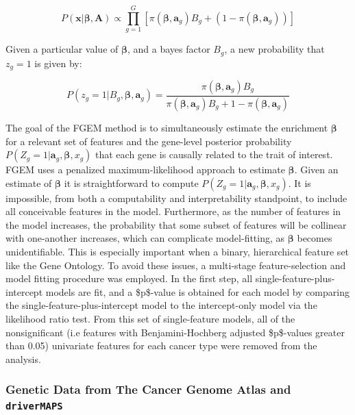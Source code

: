 $$P(\textbf{x}|\boldsymbol{\beta},\textbf{A}) \propto \prod_{g=1}^{G}[\pi(\boldsymbol{\beta},\textbf{a}_g)B_g+(1-\pi(\boldsymbol{\beta},\textbf{a}_g))]$$

Given a particular value of \(\boldsymbol{\beta}\), and a bayes factor \(B_g\),  a new probability that \(z_g=1\) is given by:

$$P(z_g=1 | B_g, \boldsymbol{\beta},\textbf{a}_g) = \frac{\pi(\boldsymbol{\beta},\textbf{a}_g) B_g}{\pi(\boldsymbol{\beta} , \textbf{a}_g) B_g + 1 - \pi(\boldsymbol{\beta},\textbf{a}_g)}$$


The goal of the FGEM method is to simultaneously estimate the enrichment $\boldsymbol{\beta}$ for a relevant set of features and the gene-level posterior probability \(P(Z_g=1|\textbf{a}_g,\boldsymbol{\beta},x_g)\) that each gene is causally related to the trait of interest.  FGEM uses a penalized maximum-likelihood approach to estimate $\boldsymbol{\beta}$.  Given an estimate of $\boldsymbol{\beta}$ it is straightforward to compute \(P(Z_g=1|\textbf{a}_g,\boldsymbol{\beta},x_g)\).
It is impossible, from both a computability and interpretability standpoint, to include all conceivable features in the model.
Furthermore, as the number of features in the model increases, the probability that some subset of features will be collinear with one-another increases,
which can complicate model-fitting, as \(\boldsymbol{\beta}\) becomes unidentifiable. This is especially important when a binary, hierarchical feature set
like the Gene Ontology.  To avoid these issues, a multi-stage feature-selection and model fitting procedure was employed. In the first step, all
single-feature-plus-intercept models are fit, and a \$p\$-value is obtained for each model by comparing the single-feature-plus-intercept model to the intercept-only model via the
likelihood ratio test.  From this set of single-feature models, all of the nonsignificant (i.e features with Benjamini-Hochberg adjusted
\$p\$-values greater than 0.05) univariate features for each cancer type were removed from the analysis.


\subsubsection{Genetic Data from The Cancer Genome Atlas and \texttt{driverMAPS}}\label{sec:org31ff9f1}

